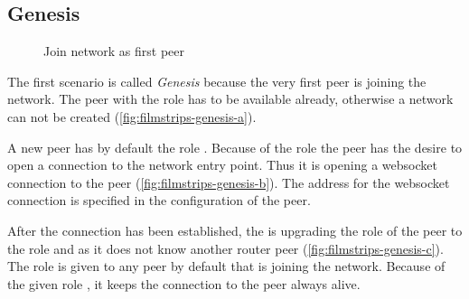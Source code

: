 \subsection{Genesis}

\begin{figure}[htb!]
  \centering
	\caption{Join network as first peer}
\label{fig:filmstrips-genesis}
\end{figure}

The first scenario is called \textit{Genesis} because the very first peer is joining the network. The peer with the role \signal has to be available already, otherwise a network can not be created (\vref{fig:filmstrips-genesis-a}). 

A new peer has by default the role \newbie. Because of the \newbie role the peer has the desire to open a connection to the network entry point. Thus it is opening a websocket connection to the \signal peer (\vref{fig:filmstrips-genesis-b}). The address for the websocket connection is specified in the configuration of the peer.

After the connection has been established, the \signal is upgrading the role of the peer to the role \router and \peer as it does not know another router peer (\vref{fig:filmstrips-genesis-c}). The role \peer is given to any peer by default that is joining the network.
Because of the given role \router, it keeps the connection to the \signal peer always alive.

